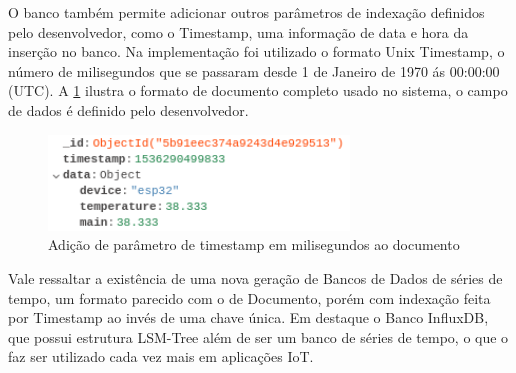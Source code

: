 O banco também permite adicionar outros parâmetros de indexação definidos pelo desenvolvedor, como o Timestamp, uma informação de data e hora da inserção no banco. Na implementação foi utilizado o formato Unix Timestamp, o número de milisegundos que se passaram desde 1 de Janeiro de 1970 ás 00:00:00 (UTC). A \ref{fig:document-timestamp} ilustra o formato de documento completo usado no sistema, o campo de dados é definido pelo desenvolvedor. 

\begin{figure}[h!]
\centering
\includegraphics[width=8cm]{./02_Capitulos/02_Cap3/figures/document-timestamp}
\caption{Adição de parâmetro de timestamp em milisegundos ao documento}
\label{fig:document-timestamp}
\end{figure}

Vale ressaltar a existência de uma nova geração de Bancos de Dados de séries de tempo, um formato parecido com o de Documento, porém com indexação feita por Timestamp ao invés de uma chave única. Em destaque o Banco InfluxDB, que possui estrutura LSM-Tree além de ser um banco de séries de tempo, o que o faz ser utilizado cada vez mais em aplicações IoT.